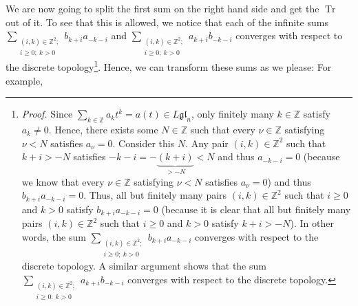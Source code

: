\documentclass[etingof-lie.tex]{subfiles}
\begin{document}
We are now going to split the first sum on the right hand side and get the
$\operatorname*{Tr}$ out of it. To see that this is allowed, we notice that
each of the infinite sums $\sum\limits_{\substack{\left(  i,k\right)
\in\mathbb{Z}^{2};\\i\geq0;\ k>0}}b_{k+i}a_{-k-i}$ and $\sum
\limits_{\substack{\left(  i,k\right)  \in\mathbb{Z}^{2};\\i\geq
0;\ k>0}}a_{k+i}b_{-k-i}$ converges with respect to the discrete
topology\footnote{\textit{Proof.} Since $\sum\limits_{k\in\mathbb{Z}}%
a_{k}t^{k}=a\left(  t\right)  \in L\mathfrak{gl}_{n}$, only finitely many
$k\in\mathbb{Z}$ satisfy $a_{k}\neq0$. Hence, there exists some $N\in
\mathbb{Z}$ such that every $\nu\in\mathbb{Z}$ satisfying $\nu<N$ satisfies
$a_{\nu}=0$. Consider this $N$. Any pair $\left(  i,k\right)  \in
\mathbb{Z}^{2}$ such that $k+i>-N$ satisfies $-k-i=-\underbrace{\left(
k+i\right)  }_{>-N}<N$ and thus $a_{-k-i}=0$ (because we know that every
$\nu\in\mathbb{Z}$ satisfying $\nu<N$ satisfies $a_{\nu}=0$) and thus
$b_{k+i}a_{-k-i}=0$. Thus, all but finitely many pairs $\left(  i,k\right)
\in\mathbb{Z}^{2}$ such that $i\geq0$ and $k>0$ satisfy $b_{k+i}a_{-k-i}=0$
(because it is clear that all but finitely many pairs $\left(  i,k\right)
\in\mathbb{Z}^{2}$ such that $i\geq0$ and $k>0$ satisfy $k+i>-N$). In other
words, the sum $\sum\limits_{\substack{\left(  i,k\right)  \in\mathbb{Z}%
^{2};\\i\geq0;\ k>0}}b_{k+i}a_{-k-i}$ converges with respect to the discrete
topology. A similar argument shows that the sum $\sum
\limits_{\substack{\left(  i,k\right)  \in\mathbb{Z}^{2};\\i\geq
0;\ k>0}}a_{k+i}b_{-k-i}$ converges with respect to the discrete topology.}.
Hence, we can transform these sums as we please: For example,%
\end{document}
